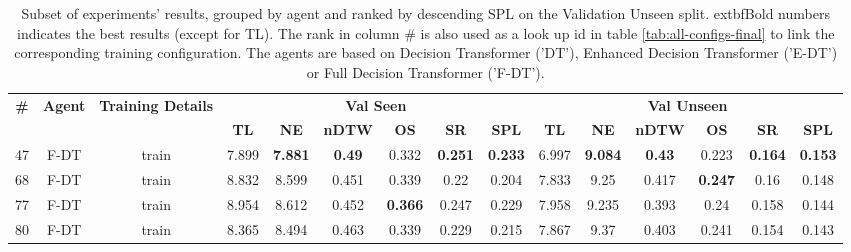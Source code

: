 \begin{table}
\centering
\caption{\label{tab:full_dt_ablation_dim}Subset of experiments' results, grouped by agent and ranked by descending SPL on the Validation Unseen split. 	extbf{Bold} numbers indicates the best results (except for TL). The rank in column \# is also used as a look up id in table \ref{tab:all-configs-final} to link the corresponding training configuration.     \newline The agents are based on Decision Transformer ('DT'), Enhanced Decision Transformer ('E-DT') or Full Decision Transformer ('F-DT').}
\begin{tabular}{@{\hskip3pt}c@{\hskip3pt}c@{\hskip3pt}c@{\hskip3pt}c@{\hskip3pt}c@{\hskip3pt}c@{\hskip3pt}c@{\hskip3pt}c@{\hskip3pt}c@{\hskip3pt}c@{\hskip3pt}c@{\hskip3pt}c@{\hskip3pt}c@{\hskip3pt}c@{\hskip3pt}c}
\toprule
\textbf{\#} & \textbf{Agent} & \textbf{Training Details} & \multicolumn{6}{c}{\textbf{Val Seen}} & \multicolumn{6}{c}{\textbf{Val Unseen}} \\
 \textbf{~} &     \textbf{~} &                \textbf{~} &       \textbf{TL} &     \textbf{NE} &  \textbf{nDTW} &     \textbf{OS} &     \textbf{SR} &    \textbf{SPL} &         \textbf{TL} &     \textbf{NE} &  \textbf{nDTW} &     \textbf{OS} &     \textbf{SR} &    \textbf{SPL} \\
\midrule
         47 &           F-DT &                     train &             7.899 &  \textbf{7.881} &  \textbf{0.49} &           0.332 &  \textbf{0.251} &  \textbf{0.233} &               6.997 &  \textbf{9.084} &  \textbf{0.43} &           0.223 &  \textbf{0.164} &  \textbf{0.153} \\
         68 &           F-DT &                     train &             8.832 &           8.599 &          0.451 &           0.339 &            0.22 &           0.204 &               7.833 &            9.25 &          0.417 &  \textbf{0.247} &            0.16 &           0.148 \\
         77 &           F-DT &                     train &             8.954 &           8.612 &          0.452 &  \textbf{0.366} &           0.247 &           0.229 &               7.958 &           9.235 &          0.393 &            0.24 &           0.158 &           0.144 \\
         80 &           F-DT &                     train &             8.365 &           8.494 &          0.463 &           0.339 &           0.229 &           0.215 &               7.867 &            9.37 &          0.403 &           0.241 &           0.154 &           0.143 \\
\bottomrule
\end{tabular}
\end{table}
